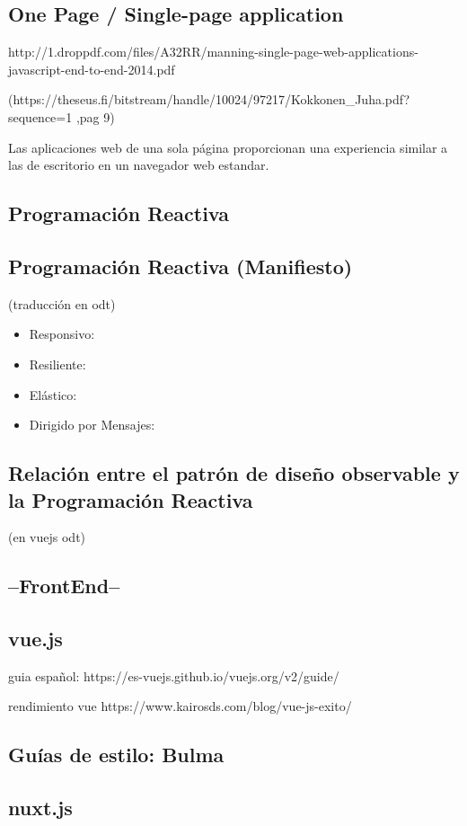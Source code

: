 \subsection{One Page / Single-page application}
http://1.droppdf.com/files/A32RR/manning-single-page-web-applications-javascript-end-to-end-2014.pdf

(https://theseus.fi/bitstream/handle/10024/97217/Kokkonen_Juha.pdf?sequence=1 ,pag 9)

Las aplicaciones web de una sola página proporcionan una experiencia similar a las de escritorio en un navegador web estandar. 

\subsection{Programación Reactiva}
\subsection{Programación Reactiva (Manifiesto)}
(traducción en odt)
\begin{itemize}
\item Responsivo:
\item Resiliente:
\item Elástico:
\item Dirigido por Mensajes:
\end{itemize}
\subsection{Relación entre el patrón de diseño observable y la Programación Reactiva}
(en vuejs odt)
\subsection{--FrontEnd--}
\subsection{vue.js}
guia español: https://es-vuejs.github.io/vuejs.org/v2/guide/

rendimiento vue
https://www.kairosds.com/blog/vue-js-exito/

\subsection{Guías de estilo: Bulma}
\subsection{nuxt.js}

